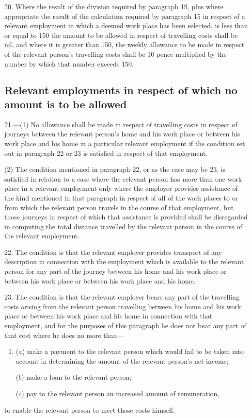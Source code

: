 \documentclass[12pt,a4paper]{article}
\begin{document}
\medskip

20.  Where the result of the division required by paragraph 19, plus where appropriate the result of the calculation required by paragraph 15 in respect of a relevant employment in which a deemed work place has been selected, is less than or equal to 150 the amount to be allowed in respect of travelling costs shall be nil, and where it is greater than 150, the weekly allowance to be made in respect of the relevant person’s travelling costs shall be 10 pence multiplied by the number by which that number exceeds 150.

\subsection*{Relevant employments in respect of which no amount is to be allowed}

21.—(1) No allowance shall be made in respect of travelling costs in respect of journeys between the relevant person’s home and his work place or between his work place and his home in a particular relevant employment if the condition set out in paragraph 22 or 23 is satisfied in respect of that employment.

(2) The condition mentioned in paragraph 22, or as the case may be 23, is satisfied in relation to a case where the relevant person has more than one work place in a relevant employment only where the employer provides assistance of the kind mentioned in that paragraph in respect of all of the work places to or from which the relevant person travels in the course of that employment, but those journeys in respect of which that assistance is provided shall be disregarded in computing the total distance travelled by the relevant person in the course of the relevant employment.

\medskip

22.  The condition is that the relevant employer provides transport of any description in connection with the employment which is available to the relevant person for any part of the journey between his home and his work place or between his work place or between his work place and his home.

\medskip

23.  The condition is that the relevant employer bears any part of the travelling costs arising from the relevant person travelling between his home and his work place or between his work place and his home in connection with that employment, and for the purposes of this paragraph he does not bear any part of that cost where he does no more than—
\begin{enumerate}\item[]
($a$) make a payment to the relevant person which would fail to be taken into account in determining the amount of the relevant person’s net income;

($b$) make a loan to the relevant person;

($c$) pay to the relevant person an increased amount of remuneration,
\end{enumerate}
to enable the relevant person to meet those costs himself.
\end{document}
